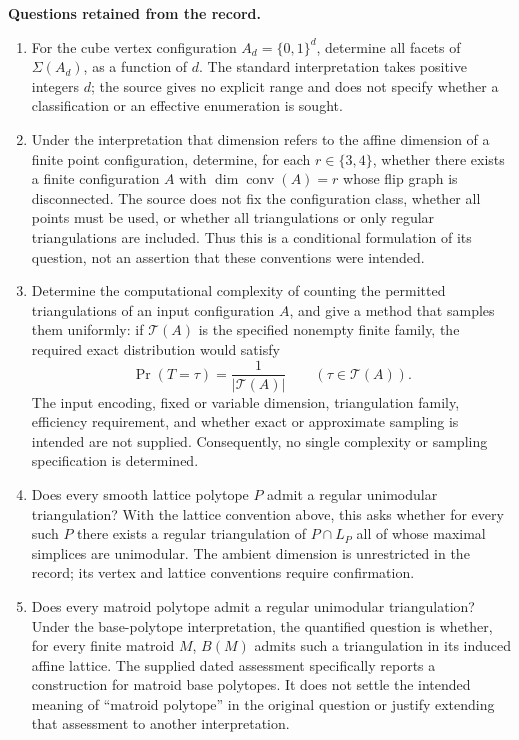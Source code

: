 \documentclass[11pt]{article}
\begin{document}
\textbf{Questions retained from the record.}
\begin{enumerate}
\item For the cube vertex configuration \(A_d=\{0,1\}^d\), determine all facets of \(\Sigma(A_d)\), as a function of \(d\). The standard interpretation takes positive integers \(d\); the source gives no explicit range and does not specify whether a classification or an effective enumeration is sought.
\item Under the interpretation that dimension refers to the affine dimension of a finite point configuration, determine, for each \(r\in\{3,4\}\), whether there exists a finite configuration \(A\) with \(\dim\operatorname{conv}(A)=r\) whose flip graph is disconnected. The source does not fix the configuration class, whether all points must be used, or whether all triangulations or only regular triangulations are included. Thus this is a conditional formulation of its question, not an assertion that these conventions were intended.
\item Determine the computational complexity of counting the permitted triangulations of an input configuration \(A\), and give a method that samples them uniformly: if \(\mathcal{T}(A)\) is the specified nonempty finite family, the required exact distribution would satisfy
\[
 \Pr(T=\tau)=\frac{1}{|\mathcal{T}(A)|}\qquad(\tau\in\mathcal{T}(A)).
\]
The input encoding, fixed or variable dimension, triangulation family, efficiency requirement, and whether exact or approximate sampling is intended are not supplied. Consequently, no single complexity or sampling specification is determined.
\item Does every smooth lattice polytope \(P\) admit a regular unimodular triangulation? With the lattice convention above, this asks whether for every such \(P\) there exists a regular triangulation of \(P\cap L_P\) all of whose maximal simplices are unimodular. The ambient dimension is unrestricted in the record; its vertex and lattice conventions require confirmation.
\item Does every matroid polytope admit a regular unimodular triangulation? Under the base-polytope interpretation, the quantified question is whether, for every finite matroid \(M\), \(B(M)\) admits such a triangulation in its induced affine lattice. The supplied dated assessment specifically reports a construction for matroid base polytopes. It does not settle the intended meaning of ``matroid polytope'' in the original question or justify extending that assessment to another interpretation.

\end{enumerate}
\end{document}
